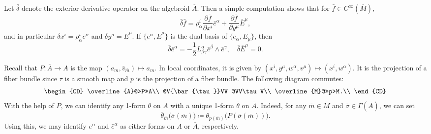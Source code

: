 \documentclass[11pt]{article}
\theoremstyle{plain}
\theoremstyle{definition}
\begin{document}
Let $\bar{\delta}$ denote the exterior derivative operator on the algebroid $\overline{A}$. Then a simple computation shows that for $\bar{f}\in C^{\infty}(\overline{M})$,
\begin{equation*}
    \bar{\delta} \bar{f}=\rho_{\alpha}^i \frac{\partial \bar{f}}{\partial x^i} \bar{e}^{\alpha}+ \frac{\partial \bar{f}}{\partial y^{\mu}}\overline{E}^{\mu},
\end{equation*}
and  in particular $\bar{\delta} x^i=\rho_{\alpha}^i\bar{e}^{\alpha}$ and $\bar{\delta}y^\mu=   \overline{E}^{\mu}$. If $\{\bar{e}^{\alpha},\overline{E}^{\mu}\}$ is the dual basis of $\{\bar{e}_{\alpha},\overline{E}_{\mu}\}$, then
\begin{equation*}
    \bar{\delta} \bar{e}^{\alpha}=-\frac{1}{2}L_{\beta \gamma}^{\alpha}\bar{e}^{\beta}\wedge \bar{e}^{\gamma},\quad \bar{\delta} \overline{E}^{\mu}=0.
\end{equation*}

Recall that  $P\colon \overline{A}\to A$ is the map $( a_m, {\bar v}_{\bar m}) \mapsto  a_m$. In local coordinates, it is given by  $(x^i,y^{\mu},w^{\alpha},v^{\mu})\mapsto (x^i,w^{\alpha})$. It is the projection of a fiber bundle since $\tau$ is a smooth map and $p$ is the projection of a fiber bundle. The following diagram commutes:
\begin{equation}\label{eqn:cd}
\begin{CD}
\overline{A}@>P>>A\\
@V{\bar{\tau}}VV @VV\tau V\\
\overline{M}@>>p>M.\\
\end{CD}
\end{equation}
With the help of $P$, we can identify any 1-form $\theta$ on $A$ with a unique 1-form $\bar\theta$ on $\overline A$. Indeed, for any $\bar m \in \overline M$ and $\bar\sigma\in\Gamma(\overline A)$, we can set
\begin{equation*}
    \bar\theta_{\bar m}\Big(\bar\sigma(\bar m)\Big)\coloneqq \theta_{p(\bar m)}\Big(P(\bar\sigma(\bar m))\Big).
\end{equation*}
Using this,  we may identify $e^\alpha$ and ${\bar e}^\alpha$ as either forms on $A$ or $\overline A$, respectively.
\end{document}
